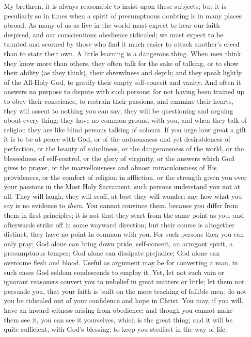 My brethren, it is always reasonable to insist upon these subjects;
but it is peculiarly so in times when a spirit of presumptuous
doubting is in many places abroad. As many of us as live in the world
must expect to hear our faith despised, and our conscientious
obedience ridiculed; we must expect to be taunted and scorned by those
who find it much easier to attack another's creed than to state their
own. A little learning is a dangerous thing. When men think they know
more than others, they often talk for the sake of talking, or to show
their ability (as they think), their shrewdness and depth; and they
speak lightly of the All-Holy God, to gratify their empty self-conceit
and vanity. And often it answers no purpose to dispute with such
persons; for not having been trained up to obey their conscience, to
restrain their passions, and examine their hearts, they will assent to
nothing you can say; they will be questioning and arguing about every
thing; they have no common ground with you, and when they talk of
religion they are like blind persons talking of colours. If you urge
how great a gift it is to be at peace with God, or of the arduousness
and yet desirableness of perfection, or the beauty of saintliness, or
the dangerousness of the world, or the blessedness of self-control, or
the glory of virginity, or the answers which God gives to prayer, or
the marvellousness and almost miraculousness of His providences, or
the comfort of religion in affliction, or the strength given you over
your passions in the Most Holy Sacrament, such persons understand you
not at all. They will laugh, they will scoff, at best they will
wonder: any how what you say is no evidence to \emph{them}. You cannot
convince them, because you differ from them in first principles; it is
not that they start from the same point as you, and afterwards strike
off in some wayward direction; but their course is altogether
distinct, they have no point in common with you. For such persons then
you can only pray; God alone can bring down pride, self-conceit, an
arrogant spirit, a presumptuous temper; God alone can dissipate
prejudice; God alone can overcome flesh and blood. Useful as argument
may be for converting a man, in such cases God seldom condescends to
employ it. Yet, let not such vain or ignorant reasoners convert you to
unbelief in great matters or little; let them not persuade you, that
your faith is built on the mere teaching of fallible men; do not you
be ridiculed out of your confidence and hope in Christ. You may, if
you will, have an inward witness arising from obedience: and though
you cannot make them see it, you can see it yourselves, which is the
great thing; and it will be quite sufficient, with God's blessing, to
keep you stedfast in the way of life.

